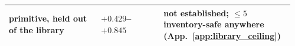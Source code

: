 {\begin{tabular}{@{}p{0.315\linewidth}p{0.215\linewidth}p{0.43\linewidth}@{}}
\textbf{primitive}, held out of the library & $+0.429$--$+0.845$ & not established; $\le5$ inventory-safe anywhere (App.~\ref{app:library_ceiling}) \\
\bottomrule
\end{tabular}}

